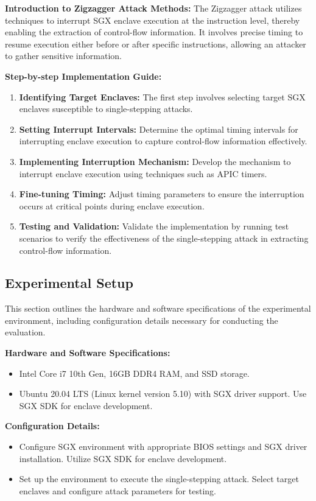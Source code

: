 \documentclass{llncs}
\begin{document}
\textbf{Introduction to Zigzagger Attack Methods:}
The Zigzagger attack utilizes techniques to interrupt SGX enclave execution at the instruction level,
thereby enabling the extraction of control-flow information.
It involves precise timing to resume execution either before or after specific instructions,
allowing an attacker to gather sensitive information.

\textbf{Step-by-step Implementation Guide:}
\begin{enumerate}
  \item \textbf{Identifying Target Enclaves:} The first step involves selecting target SGX enclaves susceptible to single-stepping attacks.
  \item \textbf{Setting Interrupt Intervals:} Determine the optimal timing intervals for interrupting enclave execution to capture control-flow information effectively.
  \item \textbf{Implementing Interruption Mechanism:} Develop the mechanism to interrupt enclave execution using techniques such as APIC timers.
  \item \textbf{Fine-tuning Timing:} Adjust timing parameters to ensure the interruption occurs at critical points during enclave execution.
  \item \textbf{Testing and Validation:} Validate the implementation by running test scenarios to verify the effectiveness of the single-stepping attack in extracting control-flow information.
\end{enumerate}

\subsection{Experimental Setup}

This section outlines the hardware and software specifications of the experimental environment, including configuration details necessary for conducting the evaluation.

\textbf{Hardware and Software Specifications:}
\begin{itemize}
  \item Intel Core i7 10th Gen, 16GB DDR4 RAM, and SSD storage.
  \item Ubuntu 20.04 LTS (Linux kernel version 5.10) with SGX driver support. Use SGX SDK for enclave development.
\end{itemize}

\textbf{Configuration Details:}
\begin{itemize}
  \item
    Configure SGX environment with appropriate BIOS settings and SGX driver installation.
    Utilize SGX SDK for enclave development.
  \item
    Set up the environment to execute the single-stepping attack.
    Select target enclaves and configure attack parameters for testing.
\end{itemize}
\end{document}
